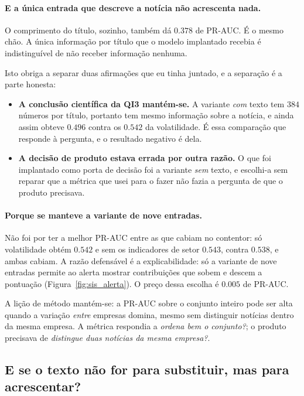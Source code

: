 \paragraph{E a única entrada que descreve a notícia não acrescenta nada.}
O comprimento do título, sozinho, também dá $0.378$ de PR-AUC. É o mesmo chão. A única informação
por título que o modelo implantado recebia é indistinguível de não receber informação nenhuma.

Isto obriga a separar duas afirmações que eu tinha juntado, e a separação é a parte honesta:

\begin{itemize}
  \item \textbf{A conclusão científica da \gls{QI}3 mantém-se.} A variante \emph{com} texto tem
        $384$ números por título, portanto tem mesmo informação sobre a notícia, e ainda assim
        obteve $0.496$ contra os $0.542$ da volatilidade. É essa comparação que responde à
        pergunta, e o resultado negativo é dela.
  \item \textbf{A decisão de produto estava errada por outra razão.} O que foi implantado como
        porta de decisão foi a variante \emph{sem} texto, e escolhi-a sem reparar que a métrica
        que usei para o fazer não fazia a pergunta de que o produto precisava.
\end{itemize}

\paragraph{Porque se manteve a variante de nove entradas.}
Não foi por ter a melhor PR-AUC entre as que cabiam no contentor: só volatilidade obtém $0.542$ e
sem os indicadores de setor $0.543$, contra $0.538$, e ambas cabiam. A razão defensável é a
explicabilidade: só a variante de nove entradas permite ao alerta mostrar contribuições que sobem e
descem a pontuação (Figura~\ref{fig:sis_alerta}). O preço dessa escolha é $0.005$ de PR-AUC.

A lição de método mantém-se: a PR-AUC sobre o conjunto inteiro pode ser alta quando a variação
\emph{entre} empresas domina, mesmo sem distinguir notícias dentro da mesma empresa. A métrica
respondia a \emph{ordena bem o conjunto?}; o produto precisava de \emph{distingue duas notícias da
mesma empresa?}.

\subsection{E se o texto não for para substituir, mas para acrescentar?}
\label{sec:av_acrescimo}

